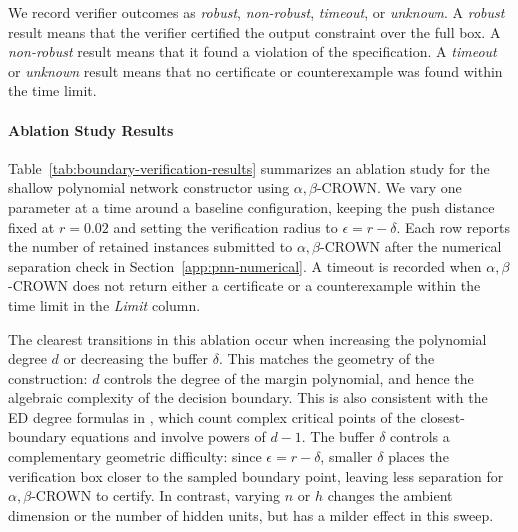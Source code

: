 \documentclass{article}
\theoremstyle{definition}
\begin{document}
We record verifier outcomes as \emph{robust}, \emph{non-robust}, \emph{timeout}, or \emph{unknown}. A \emph{robust} result means that the verifier certified the output constraint over the full box. A \emph{non-robust} result means that it found a violation of the specification. A \emph{timeout} or \emph{unknown} result means that no certificate or counterexample was found within the time limit.


\paragraph{Ablation Study Results}
\label{app:pnn-results}

Table~\ref{tab:boundary-verification-results} summarizes an ablation study for the shallow polynomial network constructor using $\alpha,\beta$-CROWN. We vary one parameter at a time around a baseline configuration, keeping the push distance fixed at $r=0.02$ and setting the verification radius to $\epsilon=r-\delta$. Each row reports the number of retained instances submitted to $\alpha,\beta$-CROWN after the numerical separation check in Section~\ref{app:pnn-numerical}. A timeout is recorded when $\alpha,\beta$-CROWN does not return either a certificate or a counterexample within the time limit in the \emph{Limit} column.

The clearest transitions in this ablation occur when increasing the polynomial degree $d$ or decreasing the buffer $\delta$. This matches the geometry of the construction: $d$ controls the degree of the margin polynomial, and hence the algebraic complexity of the decision boundary. This is also consistent with the ED degree formulas in \cite{alexandr2026robustness}, which count complex critical points of the closest-boundary equations and involve powers of $d-1$. The buffer $\delta$ controls a complementary geometric difficulty: since $\epsilon=r-\delta$, smaller $\delta$ places the verification box closer to the sampled boundary point, leaving less separation for $\alpha,\beta$-CROWN to certify. In contrast, varying $n$ or $h$ changes the ambient dimension or the number of hidden units, but has a milder effect in this sweep.
\end{document}
